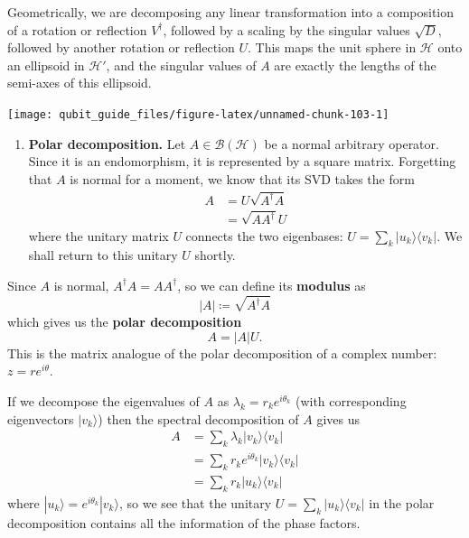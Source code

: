 \documentclass[fleqn,a4paper]{article}
\providecommand{\tightlist}{\setlength{\itemsep}{0pt}\setlength{\parskip}{0pt}}
\theoremstyle{definition}
\theoremstyle{definition}
\theoremstyle{definition}
\theoremstyle{definition}
\theoremstyle{remark}
\begin{document}
Geometrically, we are decomposing any linear transformation into a composition of a rotation or reflection \(V^\dagger\), followed by a scaling by the singular values \(\sqrt{D}\), followed by another rotation or reflection \(U\).
This maps the unit sphere in \(\mathcal{H}\) onto an ellipsoid in \(\mathcal{H}'\), and the singular values of \(A\) are exactly the lengths of the semi-axes of this ellipsoid.

\begin{center}\texttt{[image: qubit\_guide\_files/figure-latex/unnamed-chunk-103-1]} \end{center}

\begin{enumerate}
\def\labelenumi{\arabic{enumi}.}
\setcounter{enumi}{2}
\tightlist
\item
  \textbf{Polar decomposition.}
  Let \(A\in\mathcal{B}(\mathcal{H})\) be a normal arbitrary operator.
  Since it is an endomorphism, it is represented by a square matrix.
  Forgetting that \(A\) is normal for a moment, we know that its SVD takes the form
  \[
   \begin{aligned}
     A
     &= U\sqrt{A^\dagger A}
   \\&= \sqrt{AA^\dagger}U
   \end{aligned}
    \]
  where the unitary matrix \(U\) connects the two eigenbases: \(U=\sum_k|u_k\rangle\langle v_k|\).
  We shall return to this unitary \(U\) shortly.
\end{enumerate}

Since \(A\) is normal, \(A^\dagger A=AA^\dagger\), so we can define its \textbf{modulus} as
\[
    |A| \coloneqq \sqrt{A^\dagger A}
  \]
which gives us the \textbf{polar decomposition}
\[
    A = |A|U.
  \]
This is the matrix analogue of the polar decomposition of a complex number: \(z=re^{i\theta}\).

If we decompose the eigenvalues of \(A\) as \(\lambda_k=r_k e^{i\theta_k}\) (with corresponding eigenvectors \(|v_k\rangle\)) then the spectral decomposition of \(A\) gives us
\[
    \begin{aligned}
      A
      &= \sum_k \lambda_k|v_k\rangle\langle v_k|
    \\&= \sum_k r_ke^{i\theta_k}|v_k\rangle\langle v_k|
    \\&= \sum_k r_k|u_k\rangle\langle v_k|
    \end{aligned}
  \]
where \(|u_k\rangle=e^{i\theta_k}|v_k\rangle\), so we see that the unitary \(U=\sum_k|u_k\rangle\langle v_k|\) in the polar decomposition contains all the information of the phase factors.
\end{document}
